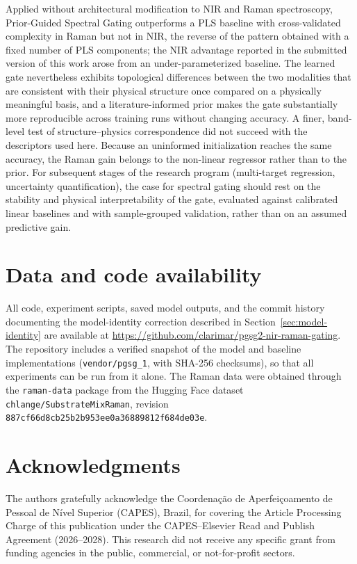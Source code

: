 \documentclass[preprint,12pt]{elsarticle}
\begin{document}
Applied without architectural modification to NIR and Raman spectroscopy, Prior-Guided Spectral Gating outperforms a PLS baseline with cross-validated complexity in Raman but not in NIR, the reverse of the pattern obtained with a fixed number of PLS components; the NIR advantage reported in the submitted version of this work arose from an under-parameterized baseline. The learned gate nevertheless exhibits topological differences between the two modalities that are consistent with their physical structure once compared on a physically meaningful basis, and a literature-informed prior makes the gate substantially more reproducible across training runs without changing accuracy. A finer, band-level test of structure--physics correspondence did not succeed with the descriptors used here. Because an uninformed initialization reaches the same accuracy, the Raman gain belongs to the non-linear regressor rather than to the prior. For subsequent stages of the research program (multi-target regression, uncertainty quantification), the case for spectral gating should rest on the stability and physical interpretability of the gate, evaluated against calibrated linear baselines and with sample-grouped validation, rather than on an assumed predictive gain.

\section*{Data and code availability}
\label{sec:availability}
All code, experiment scripts, saved model outputs, and the commit history documenting the model-identity correction described in Section~\ref{sec:model-identity} are available at \url{https://github.com/clarimar/pgsg2-nir-raman-gating}. The repository includes a verified snapshot of the model and baseline implementations (\texttt{vendor/pgsg\_1}, with SHA-256 checksums), so that all experiments can be run from it alone. The Raman data were obtained through the \texttt{raman-data} package from the Hugging Face dataset \texttt{chlange/SubstrateMixRaman}, revision \texttt{887cf66d8cb25b2b953ee0a36889812f684de03e}.

\section*{Acknowledgments}
The authors gratefully acknowledge the Coordena\c{c}\~ao de Aperfei\c{c}oamento de Pessoal de N\'ivel Superior (CAPES), Brazil, for covering the Article Processing Charge of this publication under the CAPES--Elsevier Read and Publish Agreement (2026--2028). This research did not receive any specific grant from funding agencies in the public, commercial, or not-for-profit sectors.



\end{document}
